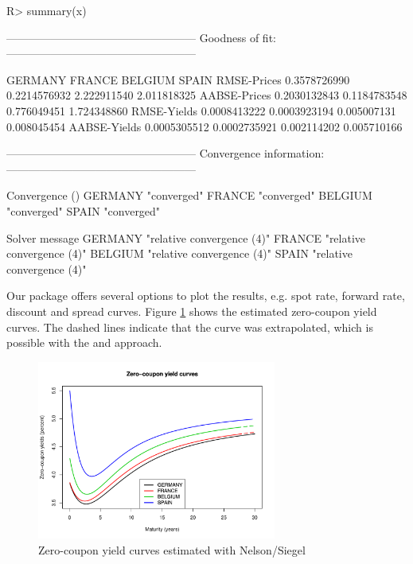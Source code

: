 \begin{Schunk}
\begin{Sinput}
R> summary(x)
\end{Sinput}
\begin{Soutput}
---------------------------------------------------
Goodness of fit:
---------------------------------------------------

                  GERMANY       FRANCE     BELGIUM       SPAIN
RMSE-Prices  0.3578726990 0.2214576932 2.222911540 2.011818325
AABSE-Prices 0.2030132843 0.1184783548 0.776049451 1.724348860
RMSE-Yields  0.0008413222 0.0003923194 0.005007131 0.008045454
AABSE-Yields 0.0005305512 0.0002735921 0.002114202 0.005710166


---------------------------------------------------
Convergence information:
---------------------------------------------------

        Convergence ()
GERMANY "converged"   
FRANCE  "converged"   
BELGIUM "converged"   
SPAIN   "converged"   

        Solver message            
GERMANY "relative convergence (4)"
FRANCE  "relative convergence (4)"
BELGIUM "relative convergence (4)"
SPAIN   "relative convergence (4)"
\end{Soutput}
\end{Schunk}



Our package offers several options to plot the results, e.g. spot rate, forward rate, discount and spread curves. Figure \ref{fig:spotcurves} shows the estimated zero-coupon yield curves. The dashed lines indicate that the curve was extrapolated, which is possible with the \cite{Nelson1987} and \cite{Svensson1994} approach.

\begin{figure}[htb]
\centering
\caption{Zero-coupon yield curves estimated with Nelson/Siegel}
\label{fig:spotcurves}
\includegraphics[width=0.7\textwidth]{fig_eurospotcurves}
\end{figure}


